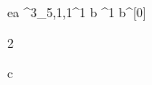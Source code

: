 \begin{eqcode}{e}{a }{^3_{5,1,1}}{^1}
  b \in {}^1 \lend
  b^{[0]} \gets \begin{tmatrix} 2  \lend \end{tmatrix} \lend
  c \gets {} \lend 
   \lend 
\end{eqcode}
